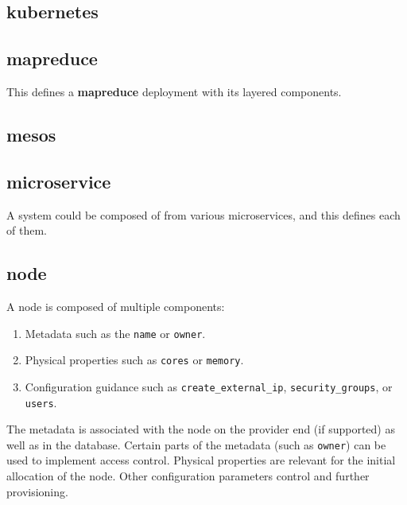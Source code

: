 \documentclass[9pt,twocolumn,twoside]{styles/osajnl}
\begin{document}
\subsection{kubernetes}


\subsection{mapreduce}

This defines a \textbf{mapreduce} deployment with its layered
components.


\subsection{mesos}


\subsection{microservice}

A system could be composed of from various microservices, and this defines
each of them.


\subsection{node}

A node is composed of multiple components:

\begin{enumerate}
\item Metadata such as the \verb|name| or \verb|owner|.
\item Physical properties such as \verb|cores| or \verb|memory|.
\item Configuration guidance such as \verb|create_external_ip|,
  \verb|security_groups|, or \verb|users|.
\end{enumerate}

The metadata is associated with the node on the provider end (if
supported) as well as in the database. Certain parts of the metadata
(such as \verb|owner|) can be used to implement access
control. Physical properties are relevant for the initial allocation
of the node. Other configuration parameters control and further
provisioning.
\end{document}
